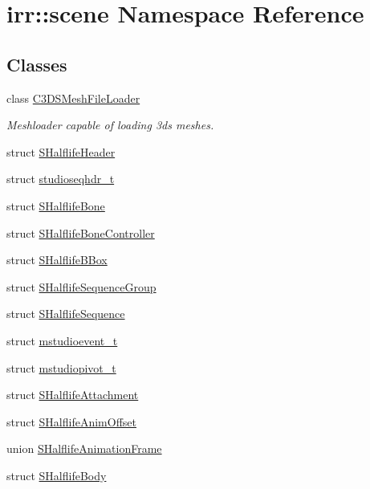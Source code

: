 \hypertarget{namespaceirr_1_1scene}{\section{irr\-:\-:scene Namespace Reference}
\label{namespaceirr_1_1scene}
}
\subsection*{Classes}
\begin{DoxyCompactItemize}
\item 
class \hyperlink{classirr_1_1scene_1_1_c3_d_s_mesh_file_loader}{C3\-D\-S\-Mesh\-File\-Loader}
\begin{DoxyCompactList}\small\item\em Meshloader capable of loading 3ds meshes. \end{DoxyCompactList}\item 
struct \hyperlink{structirr_1_1scene_1_1_s_halflife_header}{S\-Halflife\-Header}
\item 
struct \hyperlink{structirr_1_1scene_1_1studioseqhdr__t}{studioseqhdr\-\_\-t}
\item 
struct \hyperlink{structirr_1_1scene_1_1_s_halflife_bone}{S\-Halflife\-Bone}
\item 
struct \hyperlink{structirr_1_1scene_1_1_s_halflife_bone_controller}{S\-Halflife\-Bone\-Controller}
\item 
struct \hyperlink{structirr_1_1scene_1_1_s_halflife_b_box}{S\-Halflife\-B\-Box}
\item 
struct \hyperlink{structirr_1_1scene_1_1_s_halflife_sequence_group}{S\-Halflife\-Sequence\-Group}
\item 
struct \hyperlink{structirr_1_1scene_1_1_s_halflife_sequence}{S\-Halflife\-Sequence}
\item 
struct \hyperlink{structirr_1_1scene_1_1mstudioevent__t}{mstudioevent\-\_\-t}
\item 
struct \hyperlink{structirr_1_1scene_1_1mstudiopivot__t}{mstudiopivot\-\_\-t}
\item 
struct \hyperlink{structirr_1_1scene_1_1_s_halflife_attachment}{S\-Halflife\-Attachment}
\item 
struct \hyperlink{structirr_1_1scene_1_1_s_halflife_anim_offset}{S\-Halflife\-Anim\-Offset}
\item 
union \hyperlink{unionirr_1_1scene_1_1_s_halflife_animation_frame}{S\-Halflife\-Animation\-Frame}
\item 
struct \hyperlink{structirr_1_1scene_1_1_s_halflife_body}{S\-Halflife\-Body}

\end{DoxyCompactItemize}
